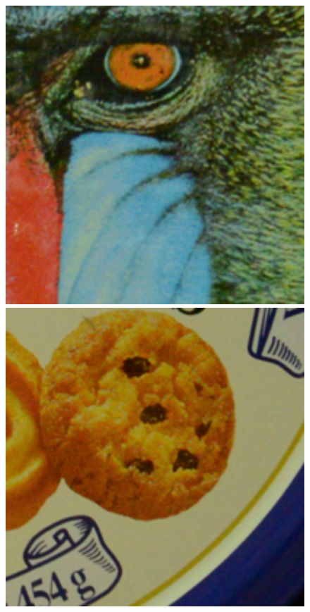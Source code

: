 \documentclass[10pt,twocolumn,letterpaper,sort&compress]{article}
\begin{document}
\begin{figure}
{\begin{minipage}{0.085\textwidth}
\end{minipage}
\begin{minipage}{0.085\textwidth}
\includegraphics[width=1\textwidth]{CC15images/resize_d600_iso3200_1_real.png}
\end{minipage}
\begin{minipage}{0.085\textwidth}
\includegraphics[width=1\textwidth]{CC15images/resize_d600_iso3200_2_real.png}

\end{minipage}}
\end{figure}
\end{document}
